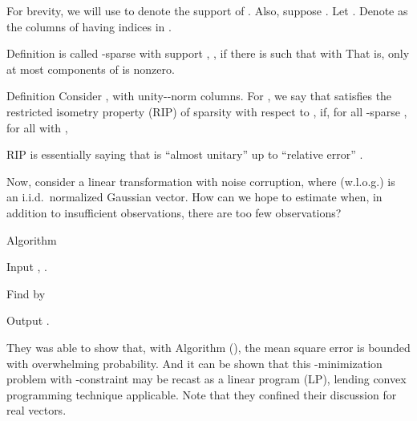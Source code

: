 For brevity, we will use  to denote the support of .
Also, suppose .
Let .
Denote as  the columns of  having indices in .

\Result
{Definition}
{
 is called -sparse with support , , if there is  such that
%
with
That is, only at most  components of  is nonzero.
}

\Result
{Definition}
{
Consider , with unity--norm columns.
For , we say that  satisfies the restricted isometry property (RIP) of sparsity  with respect to , if, for all -sparse , for all  with ,
%
}

RIP is essentially saying that  is ``almost unitary'' up to ``relative error'' .

Now, consider a linear transformation with noise corruption,
%
%
where (w.l.o.g.)  is an i.i.d.\ normalized Gaussian vector.
How can we hope to estimate  when, in addition to insufficient observations, there are too few observations?

\Result
{Algorithm}
{
\startitemize[n]
\item Input , .
\item Find  by
\item Output .
}

They was able to show that, with Algorithm (), the mean square error is bounded with overwhelming probability.
And it can be shown that this -minimization problem with \m {\ell_\infty}-constraint may be recast as a linear program (LP), lending convex programming technique applicable.
Note that they confined their discussion for real vectors.

